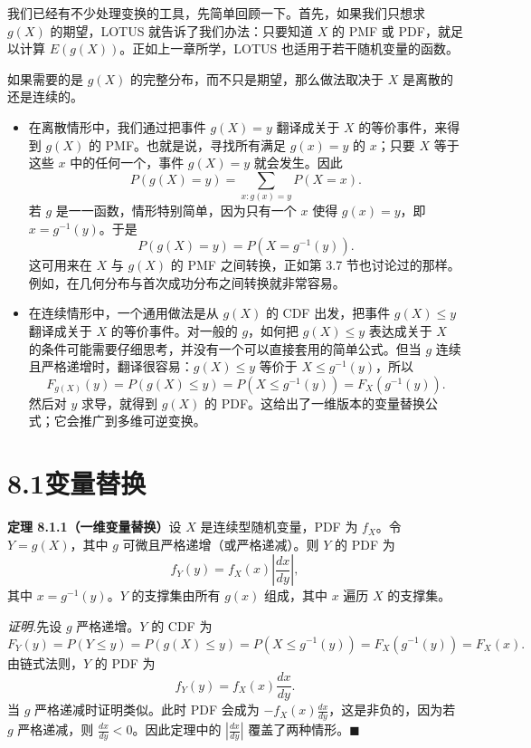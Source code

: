\documentclass[UTF8,12pt,a4paper,fontset=fandol]{ctexart}
\begin{document}
我们已经有不少处理变换的工具，先简单回顾一下。首先，如果我们只想求 $g(X)$ 的期望，LOTUS 就告诉了我们办法：只要知道 $X$ 的 PMF 或 PDF，就足以计算 $E(g(X))$。正如上一章所学，LOTUS 也适用于若干随机变量的函数。

如果需要的是 $g(X)$ 的完整分布，而不只是期望，那么做法取决于 $X$ 是离散的还是连续的。

\begin{itemize}
  \item 在离散情形中，我们通过把事件 $g(X)=y$ 翻译成关于 $X$ 的等价事件，来得到 $g(X)$ 的 PMF。也就是说，寻找所有满足 $g(x)=y$ 的 $x$；只要 $X$ 等于这些 $x$ 中的任何一个，事件 $g(X)=y$ 就会发生。因此
  \[
    P(g(X)=y)=\sum_{x:g(x)=y}P(X=x).
  \]
  若 $g$ 是一一函数，情形特别简单，因为只有一个 $x$ 使得 $g(x)=y$，即 $x=g^{-1}(y)$。于是
  \[
    P(g(X)=y)=P(X=g^{-1}(y)).
  \]
  这可用来在 $X$ 与 $g(X)$ 的 PMF 之间转换，正如第 3.7 节也讨论过的那样。例如，在几何分布与首次成功分布之间转换就非常容易。

  \item 在连续情形中，一个通用做法是从 $g(X)$ 的 CDF 出发，把事件 $g(X)\le y$ 翻译成关于 $X$ 的等价事件。对一般的 $g$，如何把 $g(X)\le y$ 表达成关于 $X$ 的条件可能需要仔细思考，并没有一个可以直接套用的简单公式。但当 $g$ 连续且严格递增时，翻译很容易：$g(X)\le y$ 等价于 $X\le g^{-1}(y)$，所以
  \[
    F_{g(X)}(y)=P(g(X)\le y)=P(X\le g^{-1}(y))=F_X(g^{-1}(y)).
  \]
  然后对 $y$ 求导，就得到 $g(X)$ 的 PDF。这给出了一维版本的变量替换公式；它会推广到多维可逆变换。
\end{itemize}

\section*{8.1\quad 变量替换}

\noindent\textbf{定理 8.1.1（一维变量替换）}\quad 设 $X$ 是连续型随机变量，PDF 为 $f_X$。令 $Y=g(X)$，其中 $g$ 可微且严格递增（或严格递减）。则 $Y$ 的 PDF 为
\[
  f_Y(y)=f_X(x)\left|\frac{dx}{dy}\right|,
\]
其中 $x=g^{-1}(y)$。$Y$ 的支撑集由所有 $g(x)$ 组成，其中 $x$ 遍历 $X$ 的支撑集。

\noindent\textit{证明.}\quad 先设 $g$ 严格递增。$Y$ 的 CDF 为
\[
  F_Y(y)=P(Y\le y)=P(g(X)\le y)=P(X\le g^{-1}(y))
  =F_X(g^{-1}(y))=F_X(x).
\]
由链式法则，$Y$ 的 PDF 为
\[
  f_Y(y)=f_X(x)\frac{dx}{dy}.
\]
当 $g$ 严格递减时证明类似。此时 PDF 会成为 $-f_X(x)\frac{dx}{dy}$，这是非负的，因为若 $g$ 严格递减，则 $\frac{dx}{dy}<0$。因此定理中的 $\left|\frac{dx}{dy}\right|$ 覆盖了两种情形。$\blacksquare$
\end{document}
